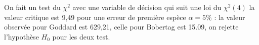 {{\begin{center}
	\end{center}
	On fait un test du $\chi^2$ avec une variable de décision qui suit une loi du $\chi^2(4)$ la valeur critique est 9,49 pour une erreur de première espèce $\alpha = 5\%$ : la valeur observée pour Goddard est 629,21, celle pour Bobertag est 15.09, on rejette l'hypothèse $H_0$ pour les deux test. }}
